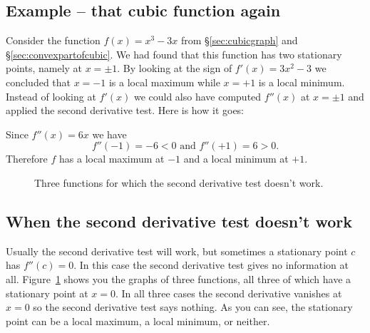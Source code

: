 \subsection{Example -- that cubic function again}
Consider the function $f(x) = x^3-3x$ from \S\ref{sec:cubicgraph} and
\S\ref{sec:convexpartofcubic}.  We had found that this function has two
stationary points, namely at $x=\pm1$.  By looking at the sign of
$f'(x) = 3x^2-3$ we concluded that $x=-1$ is a local maximum while
$x=+1$ is a local minimum.  Instead of looking at $f'(x)$ we could
also have computed $f''(x)$ at $x=\pm1$ and applied the second
derivative test.  Here is how it goes:

Since $f''(x) = 6x$ we have
\[
f''(-1) = -6 < 0 \text{ and }
f''(+1) = 6 > 0.
\]
Therefore $f$ has a local maximum at $-1$ and a local minimum at $+1$.

\begin{figure}[h]
  \centering 
  \caption{Three functions for which the second derivative test
    doesn't work.}
  \label{fig:05nonMorsepoints}
\end{figure}

\subsection{When the second derivative test doesn't work}
Usually the second derivative test will work, but sometimes a
stationary point $c$ has $f''(c)=0$.  In this case the second
derivative test gives no information at all.
Figure~\ref{fig:05nonMorsepoints} shows you the graphs of three
functions, all three of which have a stationary point at $x=0$.  In
all three cases the second derivative vanishes at $x=0$ so the second
derivative test says nothing.  As you can see, the stationary point
can be a local maximum, a local minimum, or neither.


